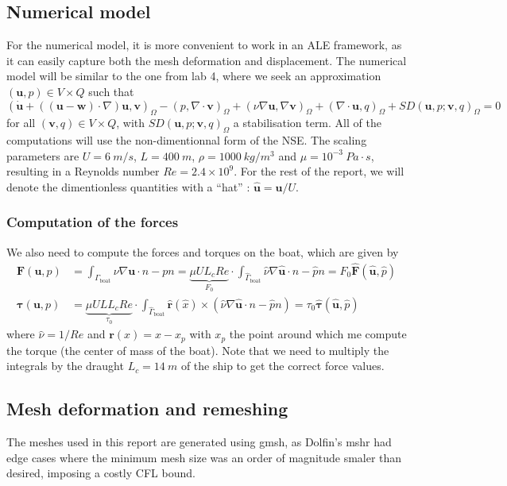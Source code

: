 \documentclass[a4paper]{article}
\newcommand{\bhu}{{\bm{\hat{u}}}}
\begin{document}
\subsection{Numerical model}
For the numerical model, it is more convenient to work in an ALE framework, as it can easily capture both the mesh deformation and displacement. The numerical model will be similar to the one from lab 4, where we seek an approximation $(\bm{u}, p) \in V \times Q$ such that
\[
    \left(\bm{\Dot{u}} + ((\bm{u}-\bm{w}) \cdot \nabla) \bm{u}, \bm{v}\right)_\Omega - (p,\nabla \cdot \bm{v})_\Omega + (\nu \nabla \bm{u},\nabla \bm{v})_\Omega + (\nabla \cdot \bm{u}, q)_\Omega + SD(\bm{u},p;\bm{v},q)_\Omega = 0
\]
for all $(\bm{v}, q) \in V \times Q$, with $SD(\bm{u},p;\bm{v},q)_\Omega$ a stabilisation term. All of the computations will use the non-dimentionnal form of the NSE. The scaling parameters are $U=\SI{6}{m/s}$, $L=\SI{400}{m}$, $\rho = \SI{1000}{kg/m^3}$ and $\mu = 10^{-3}\ \si{Pa\cdot s}$, resulting in a Reynolds number $Re = 2.4 \times 10^{9}$. For the rest of the report, we will denote the dimentionless quantities with a ``hat'' : $\bhu = \bm{u}/U$. 

\subsubsection{Computation of the forces}
We also need to compute the forces and torques on the boat, which are given by
\begin{align}
    \bm{F}(\bm{u}, p)   &= \int_{\Gamma_\text{boat}} \nu \nabla \bm{u} \cdot n - pn = \underbrace{\mu U L_c Re}_{F_0} \cdot \int_{\hat{\Gamma}_\text{boat}} \hat{\nu} \nabla \bhu \cdot n - \hat{p} n = F_0 \bm{\hat{F}}(\bhu, \hat{p}) \label{eq:forces}\\[2mm]
    \bm{\tau}(\bm{u},p) &= \underbrace{\mu U LL_c Re}_{\tau_0} \cdot \int_{\hat{\Gamma}_\text{boat}} \bm{\hat{r}}(\hat{x}) \times (\hat{\nu} \nabla \bhu \cdot n - \hat{p}n) = \tau_0 \bm{\hat{\tau}}(\bhu, \hat{p}) \label{eq:torque}
\end{align}
where $\hat{\nu} = 1/Re$ and $\bm{r}(x) = x - x_p$ with $x_p$ the point around which me compute the torque (the center of mass of the boat). Note that we need to multiply the integrals by the draught $L_c=\SI{14}{m}$ of the ship to get the correct force values.


\subsection{Mesh deformation and remeshing}
The meshes used in this report are generated using gmsh, as Dolfin's mshr had edge cases where the minimum mesh size was an order of magnitude smaler than desired, imposing a costly CFL bound.
\end{document}
